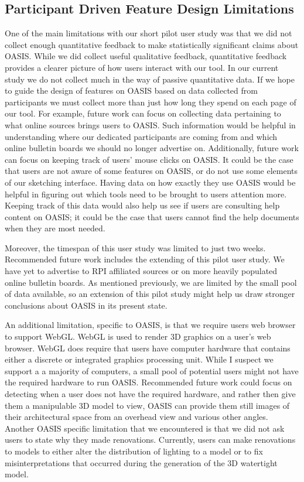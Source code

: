 \subsection{Participant Driven Feature Design Limitations}


		One of the main limitations with our short pilot user study was that we did not collect enough quantitative feedback to make statistically significant claims about OASIS. While we did collect useful qualitative feedback, quantitative feedback provides a clearer picture of how users interact with our tool. In our current study we do not collect much in the way of passive quantitative data. If we hope to guide the design of features on OASIS based on data collected from participants we must collect more than just how long they spend on each page of our tool.
		For example, future work can focus on collecting data pertaining to what online sources brings users to OASIS. Such information would be helpful in understanding where our dedicated participants are coming from and which online bulletin boards we should no longer advertise on. Additionally, future work can focus on keeping track of users' mouse clicks on OASIS.  It could be the case that users are not aware of some features on OASIS, or do not use some elements of our sketching interface. Having data on how exactly they use OASIS would be helpful in figuring out which tools need to be brought to users attention more. Keeping track of this data would also help us see if users are consulting help content on OASIS; it could be the case that users cannot find the help documents when they are most needed.
		

		Moreover, the timespan of this user study was limited to just two weeks. Recommended future work includes the extending of this pilot user study. We have yet to advertise to RPI affiliated sources or on more heavily populated online bulletin boards.
		As mentioned previously, we are limited by the small pool of data available, so an extension of this pilot study might help us draw stronger conclusions about OASIS in its present state.
		

		An additional limitation, specific to OASIS, is that we require users web browser to support WebGL. WebGL is used to render 3D graphics on a user's web browser. WebGL does require that users have  computer hardware that contains either a  discrete or integrated graphics processing unit. While I suspect we support a a majority of computers, a small pool of potential users might not have the required hardware to run OASIS. 
		Recommended future work could focus on detecting when a user does not have the required hardware, and rather then give them a manipulable 3D model to view, OASIS can provide them still images of their architectural space from an overhead view and various other angles. 
		Another OASIS specific limitation that we encountered is that we did not ask users to state why they made renovations.
		Currently, users can make renovations to models to either alter the distribution of lighting to a model or to fix misinterpretations that occurred during the generation of the 3D watertight model.

